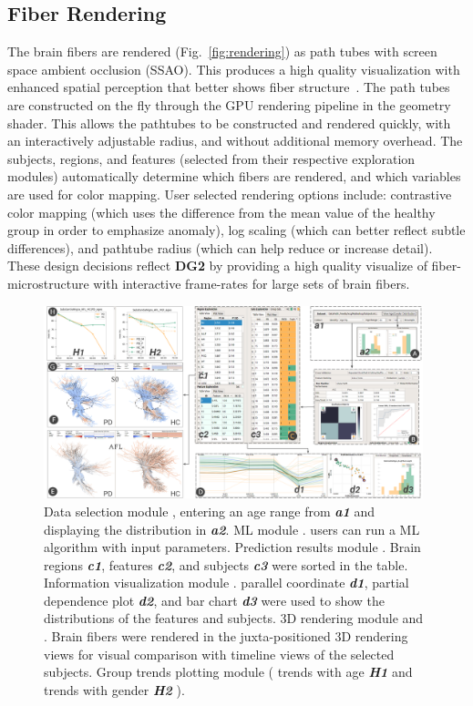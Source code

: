 \subsection{Fiber Rendering}
\label{sec:rendering}

\noindent The brain fibers are rendered (Fig.~\ref{fig:rendering}) as path tubes with screen space ambient occlusion (SSAO). This produces a high quality visualization with enhanced spatial perception that better shows fiber structure~\cite{mittring2007finding, eichelbaum2013lineao}. The path tubes are constructed on the fly through the GPU rendering pipeline in the geometry shader. This allows the pathtubes to be constructed and rendered quickly, with an interactively adjustable radius, and without additional memory overhead. The subjects, regions, and features (selected from their respective exploration modules) automatically determine which fibers are rendered, and which variables are used for color mapping.  User selected rendering options include: contrastive color mapping (which uses the difference from the mean value of the healthy group in order to emphasize anomaly), log scaling (which can better reflect subtle differences), and pathtube radius (which can help reduce or increase detail). These design decisions reflect \textbf{DG2} by providing a high quality visualize of fiber-microstructure with interactive frame-rates for large sets of brain fibers. 


\begin{figure}[t!]
\centering
\includegraphics[width=0.98\textwidth]{images/SNSteps_v5.png}%
\caption{ Data selection module , entering an age range from \textbf{\textit{a1}} and displaying the distribution in \textbf{\textit{a2}}. ML module . users can run a ML algorithm with input parameters. Prediction results module . Brain regions \textbf{\textit{c1}}, features \textbf{\textit{c2}}, and subjects \textbf{\textit{c3}} were sorted in the table. Information visualization module . parallel coordinate \textbf{\textit{d1}}, partial dependence plot \textbf{\textit{d2}}, and bar chart \textbf{\textit{d3}} were used to show the distributions of the features and subjects. 3D rendering module  and . Brain fibers were rendered in the juxta-positioned 3D rendering views for visual comparison with timeline views   of the selected subjects. Group trends plotting module  ( trends with age \textbf{\textit{H1}} and trends with gender \textbf{\textit{H2}} ).}
\label{fig:SNSteps}
\end{figure}


